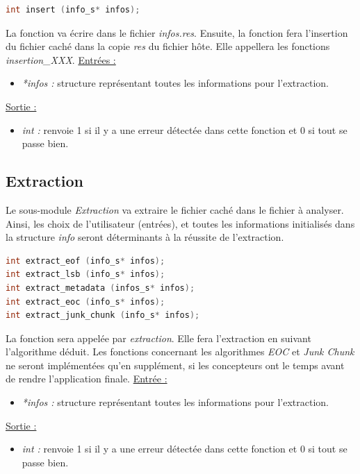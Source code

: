 \documentclass[11pt]{article}
\begin{document}
\begin{lstlisting}[language=c]
int insert (info_s* infos); 
\end{lstlisting}

La fonction va écrire dans le fichier \textit{infos.res}. 
Ensuite, la fonction fera l'insertion du fichier caché dans la copie 
\textit{res} du fichier hôte. 
Elle appellera les fonctions \textit{insertion\_XXX}. 
\newline
\underline{Entrées :} 
\begin{itemize}
\item \textit{*infos :} structure représentant toutes les informations pour 
l'extraction. 
\end{itemize}
\underline{Sortie :} 
\begin{itemize}
\item \textit{int :} renvoie 1 si il y a une erreur détectée dans cette 
fonction et 0 si tout se passe bien.  
\newline 
\end{itemize}

\subsection{Extraction}

Le sous-module \textit{Extraction} va extraire le fichier caché dans le 
fichier à analyser. Ainsi, les choix de l'utilisateur (entrées), et toutes les
informations initialisés dans la structure \textit{info} seront déterminants 
à la réussite de l'extraction. 

\begin{lstlisting}[language=c]
int extract_eof (info_s* infos); 
int extract_lsb (info_s* infos);
int extract_metadata (infos_s* infos);
int extract_eoc (info_s* infos);
int extract_junk_chunk (info_s* infos);
\end{lstlisting}

La fonction sera appelée par \textit{extraction}.
Elle fera l'extraction en suivant l'algorithme déduit. 
Les fonctions concernant les algorithmes \textit{EOC} et \textit{Junk Chunk} 
ne seront implémentées qu'en supplément, si les concepteurs ont le temps 
avant de rendre l'application finale. 
\newline
\underline{Entrée :} 
\begin{itemize}
\item \textit{*infos :} structure représentant toutes les informations pour 
l'extraction.  
\end{itemize}
\underline{Sortie :} 
\begin{itemize}
\item \textit{int :} renvoie 1 si il y a une erreur détectée dans cette 
fonction et 0 si tout se passe bien.  
\newline 
\end{itemize}
\end{document}
